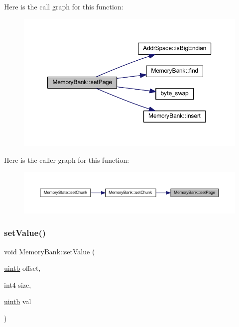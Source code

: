 Here is the call graph for this function\+:
\nopagebreak
\begin{figure}[H]
\begin{center}
\leavevmode
\includegraphics[width=350pt]{class_memory_bank_a68bf2318442e1f7da99ae85f63f9df19_cgraph}
\end{center}
\end{figure}
Here is the caller graph for this function\+:
\nopagebreak
\begin{figure}[H]
\begin{center}
\leavevmode
\includegraphics[width=350pt]{class_memory_bank_a68bf2318442e1f7da99ae85f63f9df19_icgraph}
\end{center}
\end{figure}
\mbox{\label{class_memory_bank_a331f70cbc9d2c7172ebbaaa7e185c1e9}} 
\subsubsection{\texorpdfstring{setValue()}{setValue()}}
{\footnotesize\ttfamily void Memory\+Bank\+::set\+Value (\begin{DoxyParamCaption}\item[{\mbox{\hyperlink{types_8h_a2db313c5d32a12b01d26ac9b3bca178f}{uintb}}}]{offset,  }\item[{int4}]{size,  }\item[{\mbox{\hyperlink{types_8h_a2db313c5d32a12b01d26ac9b3bca178f}{uintb}}}]{val }\end{DoxyParamCaption})}



